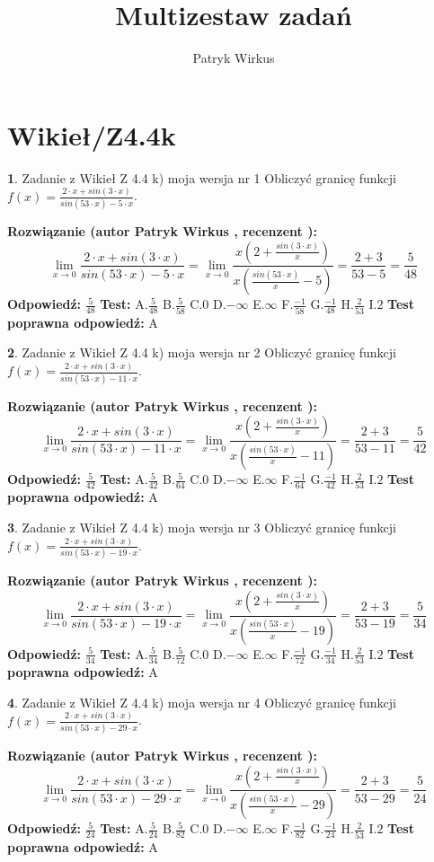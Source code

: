\documentclass[12pt, a4paper]{article}
\title{Multizestaw zadań}
\author{Patryk Wirkus}
\date{}
\theoremstyle{definition} %
\newtheorem{zad}{}
\newcommand{\kategoria}[1]{\section{#1}}
\newcommand{\zadStart}[1]{\begin{zad}#1\newline}
\newcommand{\zadStop}{\end{zad}}
\newcommand{\rozwStart}[2]{\noindent \textbf{Rozwiązanie (autor #1 , recenzent #2): }\newline}
\newcommand{\rozwStop}{\newline}
\newcommand{\odpStart}{\noindent \textbf{Odpowiedź:}\newline}
\newcommand{\odpStop}{\newline}
\newcommand{\testStart}{\noindent \textbf{Test:}\newline}
\newcommand{\testStop}{\newline}
\newcommand{\kluczStart}{\noindent \textbf{Test poprawna odpowiedź:}\newline}
\newcommand{\kluczStop}{\newline}
\begin{document}
\maketitle

\kategoria{Wikieł/Z4.4k}


\zadStart{Zadanie z Wikieł Z 4.4 k) moja wersja nr 1}
Obliczyć granicę funkcji $f(x)=\frac{2\cdot x +sin(3\cdot x)}{sin(53\cdot x) -5\cdot x}$.
\zadStop
\rozwStart{Patryk Wirkus}{}
$$\lim\limits_{x\to 0}\frac{2\cdot x +sin(3\cdot x)}{sin(53\cdot x) -5\cdot x}
=\lim\limits_{x\to 0}\frac{x(2+\frac{sin(3\cdot x)}{x})}{x(\frac{sin(53\cdot x)}{x}-5)}
=\frac{2+3}{53-5} = \frac{5}{48}$$
\rozwStop
\odpStart
$\frac{5}{48}$
\odpStop
\testStart
A.$\frac{5}{48}$
B.$\frac{5}{58}$
C.$0$
D.$-\infty$
E.$\infty$
F.$\frac{-1}{58}$
G.$\frac{-1}{48}$
H.$\frac{2}{53}$
I.$2$
\testStop
\kluczStart
A
\kluczStop



\zadStart{Zadanie z Wikieł Z 4.4 k) moja wersja nr 2}
Obliczyć granicę funkcji $f(x)=\frac{2\cdot x +sin(3\cdot x)}{sin(53\cdot x) -11\cdot x}$.
\zadStop
\rozwStart{Patryk Wirkus}{}
$$\lim\limits_{x\to 0}\frac{2\cdot x +sin(3\cdot x)}{sin(53\cdot x) -11\cdot x}
=\lim\limits_{x\to 0}\frac{x(2+\frac{sin(3\cdot x)}{x})}{x(\frac{sin(53\cdot x)}{x}-11)}
=\frac{2+3}{53-11} = \frac{5}{42}$$
\rozwStop
\odpStart
$\frac{5}{42}$
\odpStop
\testStart
A.$\frac{5}{42}$
B.$\frac{5}{64}$
C.$0$
D.$-\infty$
E.$\infty$
F.$\frac{-1}{64}$
G.$\frac{-1}{42}$
H.$\frac{2}{53}$
I.$2$
\testStop
\kluczStart
A
\kluczStop



\zadStart{Zadanie z Wikieł Z 4.4 k) moja wersja nr 3}
Obliczyć granicę funkcji $f(x)=\frac{2\cdot x +sin(3\cdot x)}{sin(53\cdot x) -19\cdot x}$.
\zadStop
\rozwStart{Patryk Wirkus}{}
$$\lim\limits_{x\to 0}\frac{2\cdot x +sin(3\cdot x)}{sin(53\cdot x) -19\cdot x}
=\lim\limits_{x\to 0}\frac{x(2+\frac{sin(3\cdot x)}{x})}{x(\frac{sin(53\cdot x)}{x}-19)}
=\frac{2+3}{53-19} = \frac{5}{34}$$
\rozwStop
\odpStart
$\frac{5}{34}$
\odpStop
\testStart
A.$\frac{5}{34}$
B.$\frac{5}{72}$
C.$0$
D.$-\infty$
E.$\infty$
F.$\frac{-1}{72}$
G.$\frac{-1}{34}$
H.$\frac{2}{53}$
I.$2$
\testStop
\kluczStart
A
\kluczStop



\zadStart{Zadanie z Wikieł Z 4.4 k) moja wersja nr 4}
Obliczyć granicę funkcji $f(x)=\frac{2\cdot x +sin(3\cdot x)}{sin(53\cdot x) -29\cdot x}$.
\zadStop
\rozwStart{Patryk Wirkus}{}
$$\lim\limits_{x\to 0}\frac{2\cdot x +sin(3\cdot x)}{sin(53\cdot x) -29\cdot x}
=\lim\limits_{x\to 0}\frac{x(2+\frac{sin(3\cdot x)}{x})}{x(\frac{sin(53\cdot x)}{x}-29)}
=\frac{2+3}{53-29} = \frac{5}{24}$$
\rozwStop
\odpStart
$\frac{5}{24}$
\odpStop
\testStart
A.$\frac{5}{24}$
B.$\frac{5}{82}$
C.$0$
D.$-\infty$
E.$\infty$
F.$\frac{-1}{82}$
G.$\frac{-1}{24}$
H.$\frac{2}{53}$
I.$2$
\testStop
\kluczStart
A
\kluczStop
\end{document}
